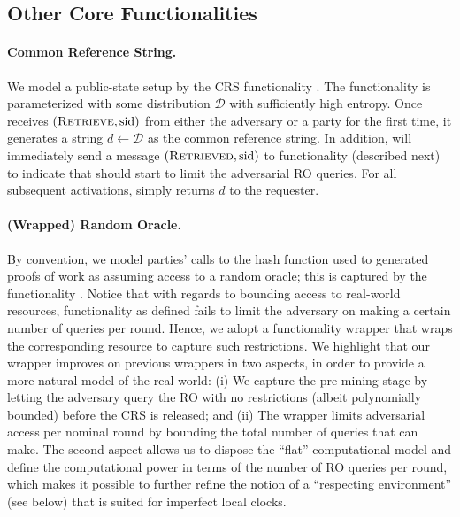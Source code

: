 \subsection{Other Core Functionalities}
\label{subsec:core-functionalities}

\paragraph{Common Reference String.}
%
We model a public-state setup by the CRS functionality \funcCRS.
%
The functionality is parameterized with some distribution $\mathcal{D}$ with sufficiently high entropy.
%
Once \funcCRS receives $(\textsc{Retrieve}, \mathrm{sid})$ from either the adversary \adv or a party \party for the first time, it generates a string $d \gets \mathcal{D}$ as the common reference string.
%
In addition, \funcCRS will immediately send a message $(\textsc{Retrieved}, \mathrm{sid})$ to functionality \wrapper{\funcRO} (described next) to indicate that \wrapper{\funcRO} should start to limit the adversarial RO queries.
%
For all subsequent activations, \funcCRS simply returns $d$ to the requester.

\paragraph{(Wrapped) Random Oracle.}
%
By convention, we model parties' calls to the hash function used to generated proofs of work as assuming access to a random oracle; this is captured by the functionality \funcRO.
%
Notice that with regards to bounding access to real-world resources, functionality \funcRO as defined fails to limit the adversary on making a certain number of queries per round.
%
Hence, we adopt a functionality wrapper \cite{C:BMTZ17,EC:GKOPZ20} \wrapper{\funcRO} that wraps the corresponding resource to capture such restrictions.
%
We highlight that our wrapper \wrapper{\funcRO} improves on previous wrappers in two aspects, in order to provide a more natural model of the real world:
%
(i) We capture the pre-mining stage by letting the adversary query the RO with no restrictions (albeit polynomially bounded) before the CRS is released;
%
and (ii) The wrapper limits adversarial access per nominal round by bounding the total number of queries that \adv can make.
%
The second aspect allows us to dispose the ``flat'' computational model and define the computational power in terms of the number of RO queries per round, which makes it possible to further refine the notion of a ``respecting environment'' (see below) that is suited for imperfect local clocks.

